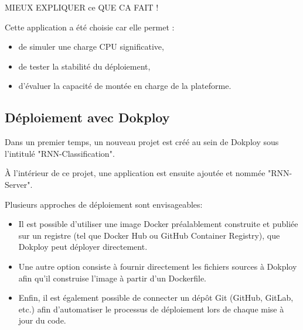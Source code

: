 \documentclass{rapportClass} %
\begin{document}
{\color{red} MIEUX EXPLIQUER ce QUE CA FAIT !}
\smallskip


Cette application a été choisie car elle permet :
\begin{itemize}[label=$\bullet$] 
\item de simuler une charge CPU significative,
\item de tester la stabilité du déploiement,
\item d’évaluer la capacité de montée en charge de la plateforme.
\end{itemize}



\subsection{Déploiement avec Dokploy}

Dans un premier temps, un nouveau projet est créé au sein de Dokploy
sous l'intitulé "RNN-Classification".

\smallskip
À l'intérieur de ce projet, une application est ensuite ajoutée et
nommée "RNN-Server".


\smallskip
Plusieurs approches de déploiement sont envisageables:
\begin{itemize}[label=$\bullet$] 
\item Il est possible d’utiliser une image Docker préalablement
  construite et publiée sur un registre (tel que Docker Hub ou GitHub
  Container Registry), que Dokploy peut déployer directement.

\item Une autre option consiste à fournir directement les fichiers
  sources à Dokploy afin qu’il construise l’image à partir d’un
  Dockerfile.

\item Enfin, il est également possible de connecter un dépôt Git
  (GitHub, GitLab, etc.) afin d’automatiser le processus de
  déploiement lors de chaque mise à jour du code.
\end{itemize}
\end{document}
